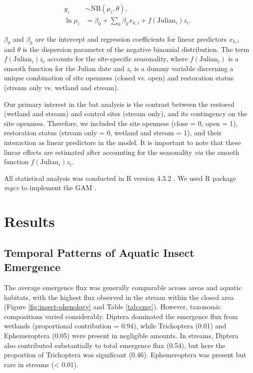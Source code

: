 \documentclass[11pt, class=article, crop=false]{standalone}
\begin{document}
\begin{align}
    y_i &\sim \mbox{NB}(\mu_i, \theta), \nonumber\\
    \ln \mu_i &= \beta_0 + \sum_k \beta_k x_{k,i} + f(\mbox{Julian}_i)z_i.
\end{align}

$\beta_0$ and $\beta_k$ are the intercept and regression coefficients for linear predictors $x_{k,i}$ and $\theta$ is the dispersion parameter of the negative binomial distribution.
The term $f(\mbox{Julian}_i)z_i$ accounts for the site-specific seasonality, where $f(\mbox{Julian}_i)$ is a smooth function for the Julian date and $z_i$ is a dummy variable discerning a unique combination of site openness (closed vs. open) and restoration status (stream only vs. wetland and stream).

Our primary interest in the bat analysis is the contrast between the restored (wetland and stream) and control sites (stream only), and its contingency on the site openness.
Therefore, we included the site openness (close = 0, open = 1), restoration status (stream only = 0, wetland and stream = 1), and their interaction as linear predictors in the model.
It is important to note that these linear effects are estimated after accounting for the seasonality \textit{via} the smooth function $f(\mbox{Julian}_i)z_i$.

All statistical analysis was conducted in R version 4.3.2 \citep{r_program}. We used R package \textit{mgcv} to implement the GAM \citep{mgcv}.

\newpage

\section{Results}

\subsection{Temporal Patterns of Aquatic Insect Emergence}

The average emergence flux was generally comparable across areas and aquatic habitats, with the highest flux observed in the stream within the closed area (Figure \ref{fig:insect-phenology} and Table \ref{tab:emg}).
However, taxonomic compositions varied considerably.
Diptera dominated the emergence flux from wetlands (proportional contribution = 0.94), while Trichoptera (0.01) and Ephemeroptera (0.05) were present in negligible amounts.
In streams, Diptera also contributed substantially to total emergence flux (0.54), but here the proportion of Trichoptera was significant (0.46).
Ephemeroptera was present but rare in streams (< 0.01).
\end{document}
